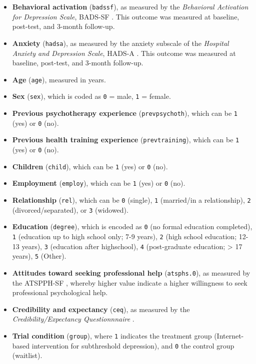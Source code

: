 \begin{itemize}
    \item \textbf{Behavioral activation} (\texttt{badssf}), as measured by the \emph{Behavioral Activation for Depression Scale}, BADS-SF \citep{manos2011behavioral}. This outcome was measured at baseline, post-test, and 3-month follow-up.
    \item \textbf{Anxiety} (\texttt{hadsa}), as measured by the anxiety subscale of the \emph{Hospital Anxiety and Depression Scale}, HADS-A \citep{zigmond1983hospital}. This outcome was measured at baseline, post-test, and 3-month follow-up.
    \item \textbf{Age} (\texttt{age}), measured in years.
    \item \textbf{Sex} (\texttt{sex}), which is coded as \texttt{0} = male, \texttt{1} = female.
    \item \textbf{Previous psychotherapy experience} (\texttt{prevpsychoth}), which can be \texttt{1} (yes) or \texttt{0} (no).
    \item \textbf{Previous health training experience} (\texttt{prevtraining}), which can be \texttt{1} (yes) or \texttt{0} (no).
    \item \textbf{Children} (\texttt{child}), which can be \texttt{1} (yes) or \texttt{0} (no).
    \item \textbf{Employment} (\texttt{employ}), which can be \texttt{1} (yes) or \texttt{0} (no).
    \item \textbf{Relationship} (\texttt{rel}), which can be \texttt{0} (single), \texttt{1} (married/in a relationship), \texttt{2} (divorced/separated), or \texttt{3} (widowed).
    \item \textbf{Education} (\texttt{degree}), which is encoded as \texttt{0} (no formal education completed), \texttt{1} (education up to high school only; 7-9 years), \texttt{2} (high school education; 12-13 years), \texttt{3} (education after highschool), \texttt{4} (post-graduate education; > 17 years), \texttt{5} (Other).
    \item \textbf{Attitudes toward seeking professional help} (\texttt{atsphs.0}), as measured by the ATSPPH-SF \citep{picco2016attitudes}, whereby higher value indicate a higher willingness to seek professional psychological help.
    \item \textbf{Credibility and expectancy} (\texttt{ceq}), as measured by the \emph{Credibility/Expectancy Questionnnaire} \citep{devilly2000psychometric}.
    \item \textbf{Trial condition} (\texttt{group}), where \texttt{1} indicates the treatment group (Internet-based intervention for subthreshold depression), and \texttt{0} the control group (waitlist).
\end{itemize}

